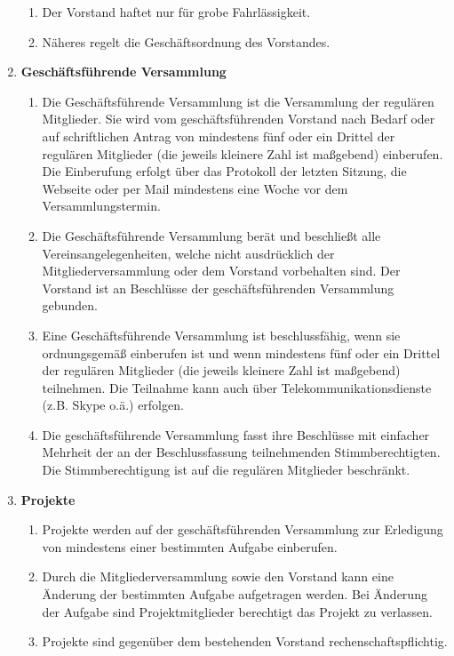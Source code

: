 \documentclass[german]{article}
\newcommand{\paragr}[1]{\item \textsf{\textbf{#1}}}
\begin{document}
\begin{enumerate}
\begin{enumerate}
\item Der Vorstand haftet nur für grobe Fahrlässigkeit.

\item Näheres regelt die Geschäftsordnung des Vorstandes.

\end{enumerate}

\paragr{Geschäftsführende Versammlung}
\begin{enumerate}
\item Die Geschäftsführende Versammlung ist die Versammlung der regulären Mitglieder. Sie wird vom geschäftsführenden Vorstand nach Bedarf oder auf schriftlichen Antrag von mindestens fünf oder ein Drittel der regulären Mitglieder (die jeweils kleinere Zahl ist maßgebend) einberufen. Die Einberufung erfolgt über das Protokoll der letzten Sitzung, die Webseite oder per Mail mindestens eine Woche vor dem Versammlungstermin.
\item Die Geschäftsführende Versammlung berät und beschließt alle Vereinsangelegenheiten, welche nicht ausdrücklich der Mitgliederversammlung oder dem Vorstand vorbehalten sind. Der Vorstand ist an Beschlüsse der geschäftsführenden Versammlung gebunden.
\item Eine Geschäftsführende Versammlung ist beschlussfähig, wenn sie ordnungsgemäß einberufen ist und wenn mindestens fünf oder ein Drittel der regulären Mitglieder (die jeweils kleinere Zahl ist maßgebend) teilnehmen. Die Teilnahme kann auch über Telekommunikationsdienste (z.B. Skype o.ä.) erfolgen.
\item Die geschäftsführende Versammlung fasst ihre Beschlüsse mit einfacher Mehrheit der an der Beschlussfassung teilnehmenden Stimmberechtigten. Die Stimmberechtigung ist auf die regulären Mitglieder beschränkt.
\end{enumerate}


\paragr{Projekte}
\begin{enumerate}

\item Projekte werden auf der geschäftsführenden Versammlung zur Erledigung von mindestens einer bestimmten Aufgabe einberufen.

\item Durch die Mitgliederversammlung sowie den Vorstand kann eine Änderung der bestimmten Aufgabe aufgetragen werden. Bei Änderung der Aufgabe sind Projektmitglieder berechtigt das Projekt zu verlassen.

\item Projekte sind gegenüber dem bestehenden Vorstand rechenschaftspflichtig.


\end{enumerate}
\end{enumerate}
\end{document}
